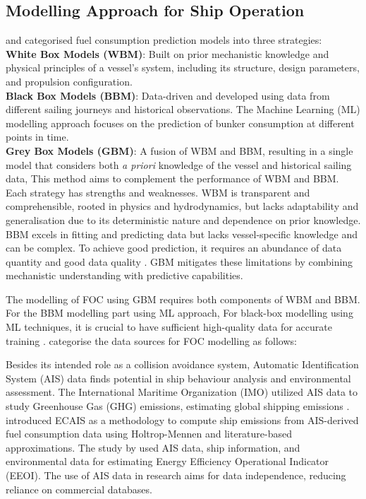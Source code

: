 \documentclass[]{interact}
\theoremstyle{plain}%
\theoremstyle{definition}
\theoremstyle{remark}
\begin{document}
\subsection{Modelling Approach for Ship Operation}\label{sec:modelling_type}

\citet{haranen2016white} and \citet{Coraddu.2017} categorised fuel consumption prediction models into three strategies:\\

\textbf{White Box Models (WBM)}: Built on prior mechanistic knowledge and physical principles of a vessel's system, including its structure, design parameters, and propulsion configuration.\\

\textbf{Black Box Models (BBM)}: Data-driven and developed using data from different sailing journeys and historical observations. The Machine Learning (ML) modelling approach focuses on the prediction of bunker consumption at different points in time.\\

\textbf{Grey Box Models (GBM)}: A fusion of WBM and BBM, resulting in a single model that considers both \emph{a priori} knowledge of the vessel and historical sailing data, This method aims to complement the performance of WBM and BBM.\\

Each strategy has strengths and weaknesses. WBM is transparent and comprehensible, rooted in physics and hydrodynamics, but lacks adaptability and generalisation due to its deterministic nature and dependence on prior knowledge. BBM excels in fitting and predicting data but lacks vessel-specific knowledge and can be complex. To achieve good prediction, it requires an abundance of data quantity and good data quality \citep{Halevy.2009}. GBM mitigates these limitations by combining mechanistic understanding with predictive capabilities.

The modelling of FOC using GBM requires both components of WBM and BBM. For the BBM modelling part using ML approach, For black-box modelling using ML techniques, it is crucial to have sufficient high-quality data for accurate training \citep{Halevy.2009}. \citet{Yan.2021} categorise the data sources for FOC modelling as follows:


Besides its intended role as a collision avoidance system, Automatic Identification System (AIS) data finds potential in ship behaviour analysis and environmental assessment. The International Maritime Organization (IMO) utilized AIS data to study Greenhouse Gas (GHG) emissions, estimating global shipping emissions \citep{IMO.2020,T.W.P.Smith.2015}. \citet{Rakke.2016} introduced ECAIS as a methodology to compute ship emissions from AIS-derived fuel consumption data using Holtrop-Mennen and literature-based approximations. The study by \citet{Kim.2020b} used AIS data, ship information, and environmental data for estimating Energy Efficiency Operational Indicator (EEOI). The use of AIS data in research aims for data independence, reducing reliance on commercial databases.
\end{document}
